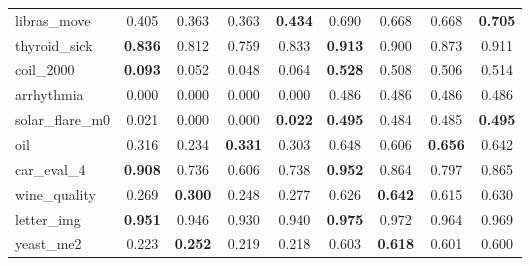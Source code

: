 \begin{figure}[ht]
\begin{tabular}{p{22mm}|*4{p{14mm}}|*4{p{14mm}}}
        libras\_move&\multicolumn{1}{c}{0.405}&\multicolumn{1}{c}{0.363}&\multicolumn{1}{c}{0.363}&\multicolumn{1}{c|}{\textbf{0.434}}&\multicolumn{1}{c}{0.690}&\multicolumn{1}{c}{0.668}&\multicolumn{1}{c}{0.668}&\multicolumn{1}{c}{\textbf{0.705}}\\
        thyroid\_sick&\multicolumn{1}{c}{\textbf{0.836}}&\multicolumn{1}{c}{0.812}&\multicolumn{1}{c}{0.759}&\multicolumn{1}{c|}{0.833}&\multicolumn{1}{c}{\textbf{0.913}}&\multicolumn{1}{c}{0.900}&\multicolumn{1}{c}{0.873}&\multicolumn{1}{c}{0.911}\\
        coil\_2000&\multicolumn{1}{c}{\textbf{0.093}}&\multicolumn{1}{c}{0.052}&\multicolumn{1}{c}{0.048}&\multicolumn{1}{c|}{0.064}&\multicolumn{1}{c}{\textbf{0.528}}&\multicolumn{1}{c}{0.508}&\multicolumn{1}{c}{0.506}&\multicolumn{1}{c}{0.514}\\
        arrhythmia&\multicolumn{1}{c}{0.000}&\multicolumn{1}{c}{0.000}&\multicolumn{1}{c}{0.000}&\multicolumn{1}{c|}{0.000}&\multicolumn{1}{c}{0.486}&\multicolumn{1}{c}{0.486}&\multicolumn{1}{c}{0.486}&\multicolumn{1}{c}{0.486}\\
        solar\_flare\_m0&\multicolumn{1}{c}{0.021}&\multicolumn{1}{c}{0.000}&\multicolumn{1}{c}{0.000}&\multicolumn{1}{c|}{\textbf{0.022}}&\multicolumn{1}{c}{\textbf{0.495}}&\multicolumn{1}{c}{0.484}&\multicolumn{1}{c}{0.485}&\multicolumn{1}{c}{\textbf{0.495}}\\
        oil&\multicolumn{1}{c}{0.316}&\multicolumn{1}{c}{0.234}&\multicolumn{1}{c}{\textbf{0.331}}&\multicolumn{1}{c|}{0.303}&\multicolumn{1}{c}{0.648}&\multicolumn{1}{c}{0.606}&\multicolumn{1}{c}{\textbf{0.656}}&\multicolumn{1}{c}{0.642}\\
        car\_eval\_4&\multicolumn{1}{c}{\textbf{0.908}}&\multicolumn{1}{c}{0.736}&\multicolumn{1}{c}{0.606}&\multicolumn{1}{c|}{0.738}&\multicolumn{1}{c}{\textbf{0.952}}&\multicolumn{1}{c}{0.864}&\multicolumn{1}{c}{0.797}&\multicolumn{1}{c}{0.865}\\
        wine\_quality&\multicolumn{1}{c}{0.269}&\multicolumn{1}{c}{\textbf{0.300}}&\multicolumn{1}{c}{0.248}&\multicolumn{1}{c|}{0.277}&\multicolumn{1}{c}{0.626}&\multicolumn{1}{c}{\textbf{0.642}}&\multicolumn{1}{c}{0.615}&\multicolumn{1}{c}{0.630}\\
        letter\_img&\multicolumn{1}{c}{\textbf{0.951}}&\multicolumn{1}{c}{0.946}&\multicolumn{1}{c}{0.930}&\multicolumn{1}{c|}{0.940}&\multicolumn{1}{c}{\textbf{0.975}}&\multicolumn{1}{c}{0.972}&\multicolumn{1}{c}{0.964}&\multicolumn{1}{c}{0.969}\\
        yeast\_me2&\multicolumn{1}{c}{0.223}&\multicolumn{1}{c}{\textbf{0.252}}&\multicolumn{1}{c}{0.219}&\multicolumn{1}{c|}{0.218}&\multicolumn{1}{c}{0.603}&\multicolumn{1}{c}{\textbf{0.618}}&\multicolumn{1}{c}{0.601}&\multicolumn{1}{c}{0.600}\\

\end{tabular}
\end{figure}
